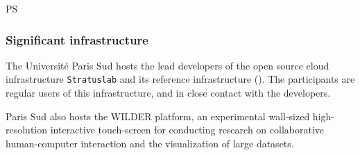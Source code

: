 \begin{sitedescription}{PS}
\subsubsection*{Significant infrastructure}

The Université Paris Sud hosts the lead developers of the open source
cloud infrastructure \texttt{Stratuslab} and its reference
infrastructure (). The participants are regular users
of this infrastructure, and in close contact with the developers.

Paris Sud also hosts the WILDER platform, an experimental wall-sized
high-resolution interactive touch-screen for conducting research on
collaborative human-computer interaction and the visualization of
large datasets.
\end{sitedescription}

